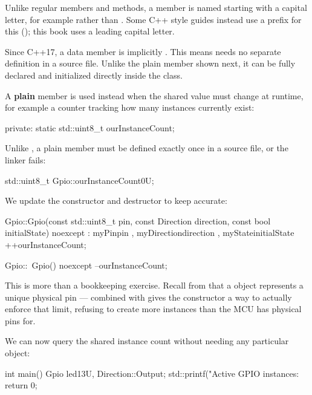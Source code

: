 \note Unlike regular  members and methods, a  member is
named starting with a capital letter, for example  rather than
. Some C++ style guides instead use a  prefix for this
(); this book uses a leading capital letter.

Since C++17, a  data member is implicitly . This means
 needs no separate definition in a source file. Unlike the plain 
member shown next, it can be fully declared and initialized directly inside the class.

A \textbf{plain } member is used instead when the shared value must change at runtime,
for example a counter tracking how many  instances currently exist:

\begin{cppcode}
private:
    static std::uint8_t ourInstanceCount;
\end{cppcode}

\noindent Unlike , a plain  member must be defined exactly once
in a source file, or the linker fails:

\begin{cppcode}
std::uint8_t Gpio::ourInstanceCount{0U};
\end{cppcode}

\noindent We update the constructor and destructor to keep  accurate:

\begin{cppcode}
Gpio::Gpio(const std::uint8_t pin, const Direction direction, const bool initialState) noexcept
    : myPin{pin}
    , myDirection{direction}
    , myState{initialState}
{
    ++ourInstanceCount;
}

Gpio::~Gpio() noexcept
{
    --ourInstanceCount;
}
\end{cppcode}

\note This is more than a bookkeeping exercise. Recall from  that a
 object represents a unique physical pin ---  combined with
 gives the constructor a way to actually enforce that limit, refusing to create
more  instances than the MCU has physical pins for.

We can now query the shared instance count without needing any particular  object:

\begin{cppcode}
int main()
{
    Gpio led{13U, Direction::Output};
    std::printf("Active GPIO instances: %
    return 0;
}
\end{cppcode}

